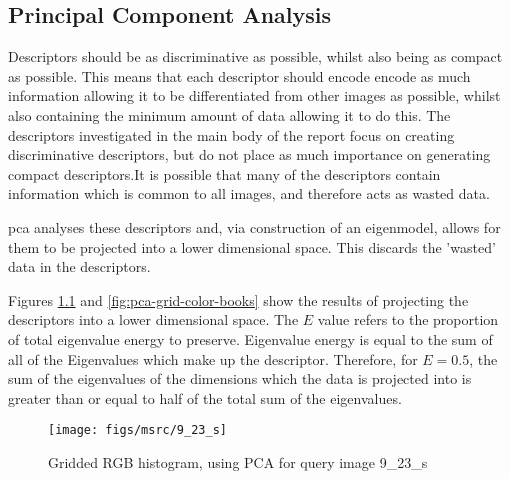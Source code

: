 \clearpage
\begin{appendices}

\chapter{Principal Component Analysis} \label{app:pca}
Descriptors should be as discriminative as possible, whilst also being as compact as possible. This means that each descriptor should encode encode as much information allowing it to be differentiated from other images as possible, whilst also containing the minimum amount of data allowing it to do this. The descriptors investigated in the main body of the report focus on creating discriminative descriptors, but do not place as much importance on generating compact descriptors.It is possible that many of the descriptors contain information which is common to all images, and therefore acts as wasted data.

\gls{pca} analyses these descriptors and, via construction of an eigenmodel, allows for them to be projected into a lower dimensional space. This discards the 'wasted' data in the descriptors.

Figures \ref{fig:pca-grid-color-sheep} and \ref{fig:pca-grid-color-books} show the results of projecting the descriptors into a lower dimensional space.  The $E$ value refers to the proportion of total eigenvalue energy to preserve. Eigenvalue energy is equal to the sum of all of the Eigenvalues which make up the descriptor. Therefore, for $E=0.5$, the sum of the eigenvalues of the dimensions which the data is projected into is greater than or equal to half of the total sum of the eigenvalues.


\begin{figure}[ht]
	\begin{minipage}[]{0.3\linewidth}
		\centering
		\texttt{[image: figs/msrc/9\_23\_s]}
	\end{minipage}
	\begin{minipage}[]{0.7\linewidth}
		\centering
		\prplotclose
	\end{minipage}
	\caption{Gridded RGB histogram, using PCA for query image 9\_23\_s}
	\label{fig:pca-grid-color-sheep}
\end{figure}


\end{appendices}
